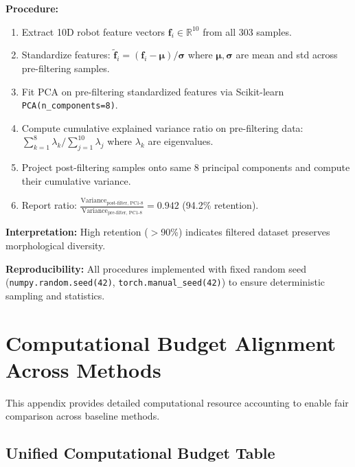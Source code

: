 \documentclass[a4paper]{cas-sc}
\begin{document}
\textbf{Procedure:}
\begin{enumerate}[leftmargin=*, itemsep=1pt]
    \item Extract 10D robot feature vectors $\mathbf{f}_i \in \mathbb{R}^{10}$ from all 303 samples.
    \item Standardize features: $\tilde{\mathbf{f}}_i = (\mathbf{f}_i - \bm{\mu}) / \bm{\sigma}$ where $\bm{\mu}, \bm{\sigma}$ are mean and std across pre-filtering samples.
    \item Fit PCA on pre-filtering standardized features via Scikit-learn \texttt{PCA(n\_components=8)}.
    \item Compute cumulative explained variance ratio on pre-filtering data: $\sum_{k=1}^{8} \lambda_k / \sum_{j=1}^{10} \lambda_j$ where $\lambda_k$ are eigenvalues.
    \item Project post-filtering samples onto same 8 principal components and compute their cumulative variance.
    \item Report ratio: $\frac{\text{Variance}_{\text{post-filter, PC1-8}}}{\text{Variance}_{\text{pre-filter, PC1-8}}} = 0.942$ (94.2\% retention).
\end{enumerate}

\textbf{Interpretation:} High retention ($>$90\%) indicates filtered dataset preserves morphological diversity.

\textbf{Reproducibility:} All procedures implemented with fixed random seed (\texttt{numpy.random.seed(42)}, \texttt{torch.manual\_seed(42)}) to ensure deterministic sampling and statistics.

\section{Computational Budget Alignment Across Methods}
\label{app:budget_alignment}

This appendix provides detailed computational resource accounting to enable fair comparison across baseline methods.

\subsection{Unified Computational Budget Table}
\end{document}
